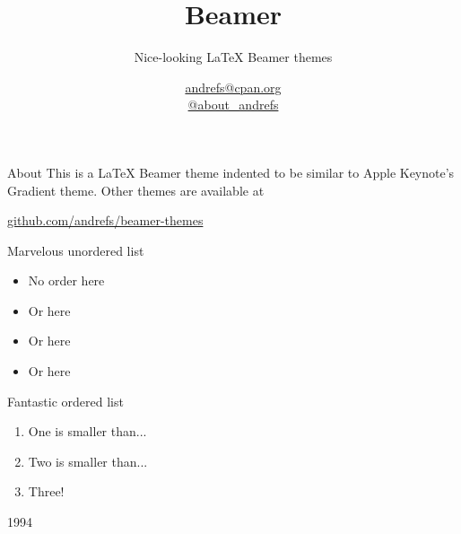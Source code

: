 \documentclass[serif,14pt,color=usenames,dvipsnames]{beamer}
\title{Beamer}
\subtitle{Nice-looking LaTeX Beamer themes}
\author{\href{mailto:andrefs@cpan.org}{andrefs@cpan.org}\\\href{http://twitter.com/about\_andrefs}{@about\_andrefs}}
\institute{Institute, Location}
\begin{document}
\begin{frame}
\maketitle
\end{frame}

\begin{frame}{About}
This is a LaTeX Beamer theme indented to be similar to Apple Keynote's
Gradient theme. Other themes are available at
\begin{center}
\url{github.com/andrefs/beamer-themes}
\end{center}
\end{frame}

\begin{frame}{Marvelous unordered list}
\begin{itemize}
\item No order here
\item Or here
\item Or here
\item Or here
\end{itemize}
\end{frame}

\begin{frame}{Fantastic ordered list}
\begin{enumerate}
	\item One is smaller than...
	\item Two is smaller than...
	\item Three!
\end{enumerate}
\end{frame}

\begin{frame}{1994}

\end{frame}
\end{document}
